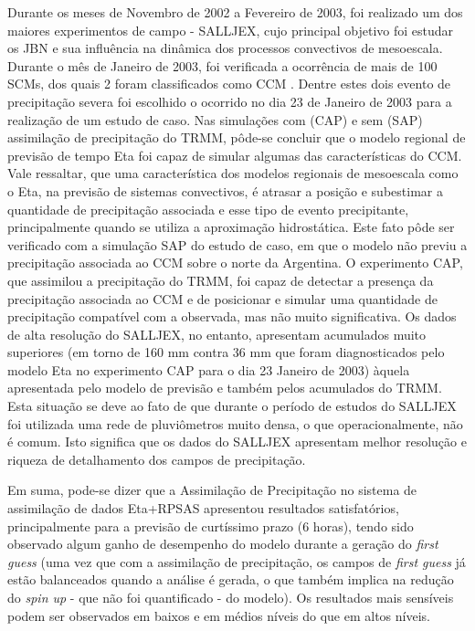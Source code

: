 Durante os meses de Novembro de 2002 a Fevereiro de 2003, foi realizado um dos maiores experimentos de campo - SALLJEX, cujo principal objetivo foi estudar os JBN e sua influência na dinâmica dos processos convectivos de mesoescala. Durante o mês de Janeiro de 2003, foi verificada a ocorrência de mais de 100 SCMs, dos quais 2 foram classificados como CCM \cite{zipseretal04}. Dentre estes dois evento de precipitação severa foi escolhido o ocorrido no dia 23 de Janeiro de 2003 para a realização de um estudo de caso. Nas simulações com (CAP) e sem (SAP) assimilação de precipitação do TRMM, pôde-se concluir que o modelo regional de previsão de tempo Eta foi capaz de simular algumas das características do CCM. Vale ressaltar, que uma característica dos modelos regionais de mesoescala como o Eta, na previsão de sistemas convectivos, é atrasar a posição e subestimar a quantidade de precipitação associada e esse tipo de evento precipitante, principalmente quando se utiliza a aproximação hidrostática. Este fato pôde ser verificado com a simulação SAP do estudo de caso, em que o modelo não previu a precipitação associada ao CCM sobre o norte da Argentina. O experimento CAP, que assimilou a precipitação do TRMM, foi capaz de detectar a presença da precipitação associada ao CCM e de posicionar e simular uma quantidade de precipitação compatível com a observada, mas não muito significativa. Os dados de alta resolução do SALLJEX, no entanto, apresentam acumulados muito superiores (em torno de 160 mm contra 36 mm que foram diagnosticados pelo modelo Eta no experimento CAP para o dia 23 Janeiro de 2003) àquela apresentada pelo modelo de previsão e também pelos acumulados do TRMM. Esta situação se deve ao fato de que durante o período de estudos do SALLJEX foi utilizada uma rede de pluviômetros muito densa, o que operacionalmente, não é comum. Isto significa que os dados do SALLJEX apresentam melhor resolução e riqueza de detalhamento dos campos de precipitação.

Em suma, pode-se dizer que a Assimilação de Precipitação no sistema de assimilação de dados Eta+RPSAS apresentou resultados satisfatórios, principalmente para a previsão de curtíssimo prazo (6 horas), tendo sido observado algum ganho de desempenho do modelo durante a geração do \textit{first guess} (uma vez que com a assimilação de precipitação, os campos de \textit{first guess} já estão balanceados quando a análise é gerada, o que também implica na redução do \textit{spin up} - que não foi quantificado - do modelo). Os resultados mais sensíveis podem ser observados em baixos e em médios níveis do que em altos níveis.

